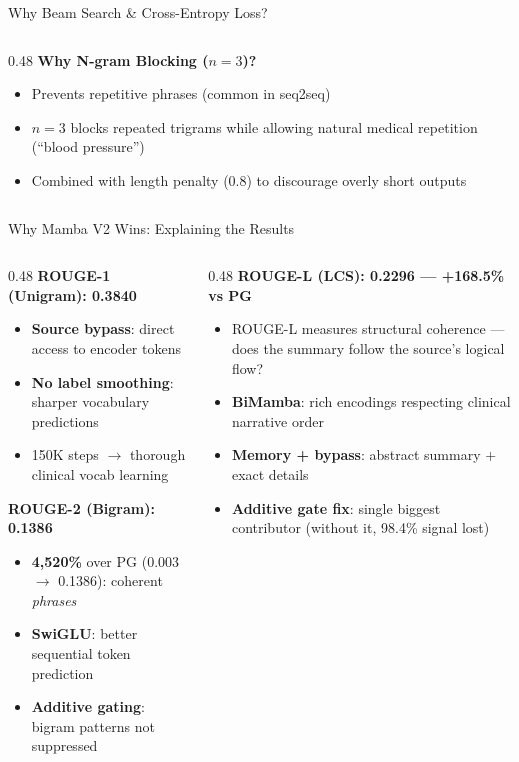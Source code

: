 \documentclass[10pt, aspectratio=169]{beamer}
\begin{document}
\begin{frame}{Why Beam Search \& Cross-Entropy Loss?}
\begin{columns}[T]
\begin{column}{0.48\textwidth}
      \vspace{0.1cm}
      \textbf{Why N-gram Blocking ($n{=}3$)?}
      \begin{itemize}\setlength{\itemsep}{0pt}
        \item Prevents repetitive phrases (common in seq2seq)
        \item $n{=}3$ blocks repeated trigrams while allowing natural medical repetition (``blood pressure'')
        \item Combined with length penalty (0.8) to discourage overly short outputs
      \end{itemize}
    \end{column}
  \end{columns}
\end{frame}

\begin{frame}{Why Mamba V2 Wins: Explaining the Results}
  \small
  \begin{columns}[T]
    \begin{column}{0.48\textwidth}
      \textbf{ROUGE-1 (Unigram): 0.3840}
      \begin{itemize}\setlength{\itemsep}{0pt}
        \item \textbf{Source bypass}: direct access to encoder tokens
        \item \textbf{No label smoothing}: sharper vocabulary predictions
        \item 150K steps $\rightarrow$ thorough clinical vocab learning
      \end{itemize}

      \vspace{0.1cm}
      \textbf{ROUGE-2 (Bigram): 0.1386}
      \begin{itemize}\setlength{\itemsep}{0pt}
        \item \textbf{4,520\%} over PG (0.003 $\rightarrow$ 0.1386): coherent \emph{phrases}
        \item \textbf{SwiGLU}: better sequential token prediction
        \item \textbf{Additive gating}: bigram patterns not suppressed
      \end{itemize}
    \end{column}
    \begin{column}{0.48\textwidth}
      \textbf{ROUGE-L (LCS): 0.2296 --- +168.5\% vs PG}
      \begin{itemize}\setlength{\itemsep}{0pt}
        \item ROUGE-L measures structural coherence --- does the summary follow the source's logical flow?
        \item \textbf{BiMamba}: rich encodings respecting clinical narrative order
        \item \textbf{Memory + bypass}: abstract summary + exact details
        \item \textbf{Additive gate fix}: single biggest contributor (without it, 98.4\% signal lost)
      \end{itemize}


\end{column}
\end{columns}
\end{frame}
\end{document}
